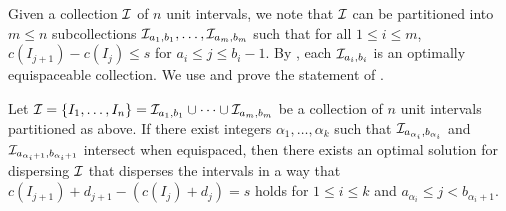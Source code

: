 Given a collection $\mathcal{I}$ of $n$ unit intervals, we note that $\mathcal{I}$ can be partitioned into $m\le n$ subcollections $\mathcal{I}_{a_1,b_1},\ldots,\mathcal{I}_{a_{m},b_{m}}$ such that for all $1\le i \le m$, $c(I_{j+1})-c(I_{j}) \le s$ for $a_i \le j \le b_i -1$.
By , each $\mathcal{I}_{a_i,b_i}$ is an optimally equispaceable collection.
We use  and prove the statement of .

\begin{mlemmarep}\label{lem:consec_partition_opt}
    Let $\mathcal{I} = \{I_1,\ldots,I_n\} = \mathcal{I}_{a_1,b_1}\cup\cdots\cup\mathcal{I}_{a_{m},b_{m}}$ be a collection of $n$ unit intervals partitioned as above.
    If there exist integers $\alpha_1, \ldots, \alpha_k$ such that $\mathcal{I}_{a_{\alpha_i},b_{\alpha_i}}$ and $\mathcal{I}_{a_{\alpha_i + 1},b_{\alpha_i + 1}}$ intersect when equispaced,
    then there exists an optimal solution for dispersing $\mathcal{I}$ that disperses the intervals in a way that $c(I_{j+1})+d_{j+1} - (c(I_j) + d_j) = s$ holds for $1 \le i \le k$ and $a_{\alpha_i} \le j < b_{\alpha_i + 1}$.
\end{mlemmarep}
